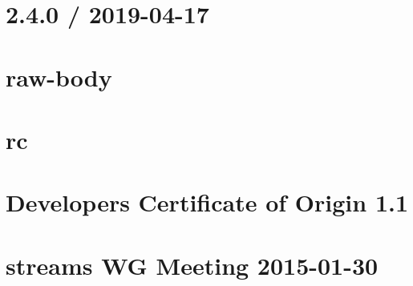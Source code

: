 \let\mypdfximage\pdfximage\def\pdfximage{\immediate\mypdfximage}\documentclass[twoside]{book}
\newcommand{\+}{\discretionary{\mbox{\scriptsize$\hookleftarrow$}}{}{}}
\begin{document}
\chapter{2.4.0 / 2019-\/04-\/17}
\label{md__c_1__git_hub__p_r_o_y_e_c_t_o-_i_i_i-_g_o_t_rest-api-node-mysql_node_modules_raw-body__h_i_s_t_o_r_y}

\chapter{raw-\/body}
\label{md__c_1__git_hub__p_r_o_y_e_c_t_o-_i_i_i-_g_o_t_rest-api-node-mysql_node_modules_raw-body__r_e_a_d_m_e}

\chapter{rc}
\label{md__c_1__git_hub__p_r_o_y_e_c_t_o-_i_i_i-_g_o_t_rest-api-node-mysql_node_modules_rc__r_e_a_d_m_e}

\chapter{Developer\textquotesingle{}s Certificate of Origin 1.1}
\label{md__c_1__git_hub__p_r_o_y_e_c_t_o-_i_i_i-_g_o_t_rest-api-node-mysql_node_modules_readable-stream__c_o_n_t_r_i_b_u_t_i_n_g}

\chapter{streams WG Meeting 2015-\/01-\/30}
\label{md__c_1__git_hub__p_r_o_y_e_c_t_o-_i_i_i-_g_o_t_rest-api-node-mysql_node_modules_readable-stream_doc_wg-meetings_2015-01-30}

\end{document}
